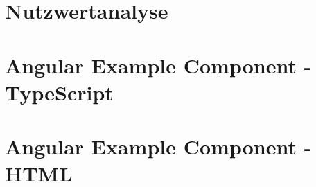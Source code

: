 \begin{appendices}
\section{Nutzwertanalyse}
\label{appendix:nutzwertanalyse}

\begin{figure}[h]
\end{figure}
\newpage

\section{Angular Example Component - TypeScript}
\label{appendix:component_ts}

\begin{figure}[h]
\end{figure}
\newpage

\section{Angular Example Component - HTML}
\label{appendix:component_html}


\end{appendices}
